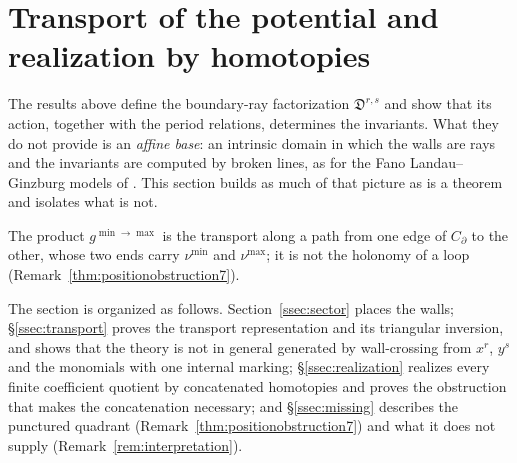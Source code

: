 \documentclass[11pt]{amsart}
\theoremstyle{definition}
\theoremstyle{remark}
\newcommand{\Dscr}{\mathfrak{D}}
\begin{document}
\section{Transport of the potential and realization by homotopies}
\label{sec:geometric}

The results above define the boundary-ray factorization
$\Dscr^{r,s}$ and show that its action, together with the period relations,
determines the invariants. What they do not provide is an
\emph{affine base}: an intrinsic domain in which the walls are rays and the
invariants are computed by broken lines, as for the Fano Landau--Ginzburg models
of \cite{Gross10,CPS}. This section builds as much of that picture as is a theorem
and isolates what is not.

The product $g^{\min\to\max}$ is the transport
along a path from one edge of $C_\partial$ to the other, whose two ends carry
$\nu^{\min}$ and $\nu^{\max}$; it is not the holonomy of a loop
(Remark~\ref{thm:positionobstruction7}).

The section is organized as follows.  Section~\ref{ssec:sector} places the
walls; \S\ref{ssec:transport} proves the transport representation and its
triangular inversion, and shows that the theory is not in general generated
by wall-crossing from $x^r$, $y^s$ and the monomials with one internal
marking; \S\ref{ssec:realization} realizes every finite coefficient
quotient by concatenated homotopies and proves the obstruction that makes the
concatenation necessary; and \S\ref{ssec:missing} describes the punctured
quadrant (Remark~\ref{thm:positionobstruction7}) and what it does not
supply (Remark~\ref{rem:interpretation}).
\end{document}
